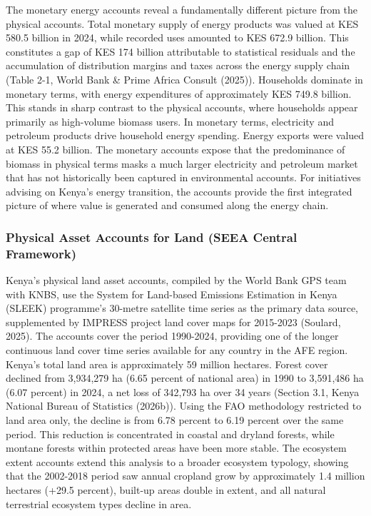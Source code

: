 \documentclass[
  letterpaper,
  DIV=11,
  numbers=noendperiod]{scrartcl}
\begin{document}
The monetary energy accounts reveal a fundamentally different picture
from the physical accounts. Total monetary supply of energy products was
valued at KES 580.5 billion in 2024, while recorded uses amounted to KES
672.9 billion. This constitutes a gap of KES 174 billion attributable to
statistical residuals and the accumulation of distribution margins and
taxes across the energy supply chain (Table 2-1, World Bank \& Prime
Africa Consult (2025)). Households dominate in monetary terms, with
energy expenditures of approximately KES 749.8 billion. This stands in
sharp contrast to the physical accounts, where households appear
primarily as high-volume biomass users. In monetary terms, electricity
and petroleum products drive household energy spending. Energy exports
were valued at KES 55.2 billion. The monetary accounts expose that the
predominance of biomass in physical terms masks a much larger
electricity and petroleum market that has not historically been captured
in environmental accounts. For initiatives advising on Kenya's energy
transition, the accounts provide the first integrated picture of where
value is generated and consumed along the energy chain.

\subsubsection{Physical Asset Accounts for Land (SEEA Central
Framework)}\label{physical-asset-accounts-for-land-seea-central-framework}

Kenya's physical land asset accounts, compiled by the World Bank GPS
team with KNBS, use the System for Land-based Emissions Estimation in
Kenya (SLEEK) programme's 30-metre satellite time series as the primary
data source, supplemented by IMPRESS project land cover maps for
2015-2023 (Soulard, 2025). The accounts cover the period 1990-2024,
providing one of the longer continuous land cover time series available
for any country in the AFE region. Kenya's total land area is
approximately 59 million hectares. Forest cover declined from 3,934,279
ha (6.65 percent of national area) in 1990 to 3,591,486 ha (6.07
percent) in 2024, a net loss of 342,793 ha over 34 years (Section 3.1,
Kenya National Bureau of Statistics (2026b)). Using the FAO methodology
restricted to land area only, the decline is from 6.78 percent to 6.19
percent over the same period. This reduction is concentrated in coastal
and dryland forests, while montane forests within protected areas have
been more stable. The ecosystem extent accounts extend this analysis to
a broader ecosystem typology, showing that the 2002-2018 period saw
annual cropland grow by approximately 1.4 million hectares (+29.5
percent), built-up areas double in extent, and all natural terrestrial
ecosystem types decline in area.
\end{document}
